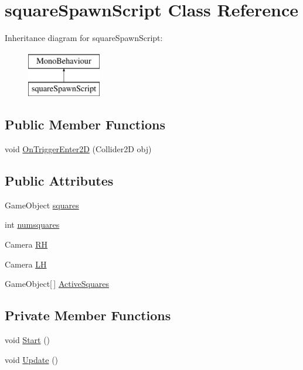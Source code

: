\hypertarget{classsquare_spawn_script}{}\section{square\+Spawn\+Script Class Reference}
\label{classsquare_spawn_script}
Inheritance diagram for square\+Spawn\+Script\+:\begin{figure}[H]
\begin{center}
\leavevmode
\includegraphics[height=2.000000cm]{classsquare_spawn_script}
\end{center}
\end{figure}
\subsection*{Public Member Functions}
\begin{DoxyCompactItemize}
\item 
void \hyperlink{classsquare_spawn_script_a072454e82d37b10169a363717acfc2be}{On\+Trigger\+Enter2\+D} (Collider2\+D obj)
\end{DoxyCompactItemize}
\subsection*{Public Attributes}
\begin{DoxyCompactItemize}
\item 
Game\+Object \hyperlink{classsquare_spawn_script_a353637659973cde399b46b194b30eb2e}{squares}
\item 
int \hyperlink{classsquare_spawn_script_aee81b01036a29f961a113a21183173e3}{numsquares}
\item 
Camera \hyperlink{classsquare_spawn_script_acc39770a5d684a4b5e1057b832dc979d}{R\+H}
\item 
Camera \hyperlink{classsquare_spawn_script_abf8f64837c29453bfe6231d48b06b483}{L\+H}
\item 
Game\+Object\mbox{[}$\,$\mbox{]} \hyperlink{classsquare_spawn_script_a0e6aed8ea0e260ec6dc7a811801b859d}{Active\+Squares}
\end{DoxyCompactItemize}
\subsection*{Private Member Functions}
\begin{DoxyCompactItemize}
\item 
void \hyperlink{classsquare_spawn_script_adfc7e870640ae864df5da2c89c275c21}{Start} ()
\item 
void \hyperlink{classsquare_spawn_script_a15ca0135d30bf57f8e3ba0c510217ebd}{Update} ()
\end{DoxyCompactItemize}


